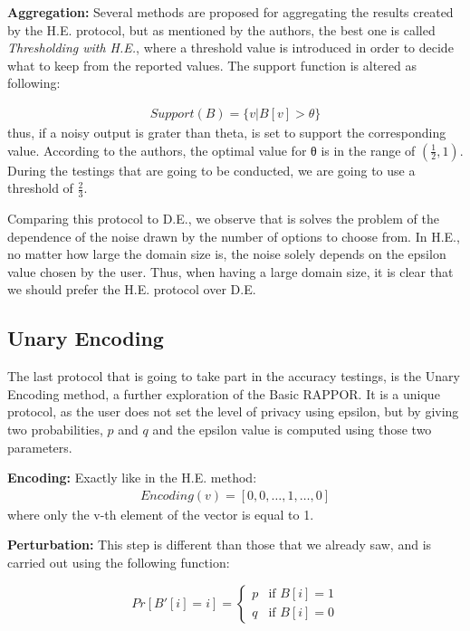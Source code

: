 \textbf{Aggregation:} Several methods are proposed for aggregating the results created by the H.E. protocol, but as mentioned by the authors, the best one is called \emph{Thresholding with H.E.}, where a threshold value is introduced in order to decide what to keep from the reported values. The support function is altered as following:

\begin{align*}
    Support(B) = \{v | B[v] > \theta\}
\end{align*}
thus, if a noisy output is grater than theta, is set to support the corresponding value. According to the authors, the optimal value for θ is in the range of $(\frac{1}{2}, 1)$. During the testings that are going to be conducted, we are going to use a threshold of $\frac{2}{3}$.


Comparing this protocol to D.E., we observe that is solves the problem of the dependence of the noise drawn by the number of options to choose from. In H.E., no matter how large the domain size is, the noise solely depends on the epsilon value chosen by the user. Thus, when having a large domain size, it is clear that we should prefer the H.E. protocol over D.E.

\subsection{Unary Encoding}

The last protocol that is going to take part in the accuracy testings, is the Unary Encoding method, a further exploration of the Basic RAPPOR. It is a unique protocol, as the user does not set the level of privacy using epsilon, but by giving two probabilities, $p$ and $q$ and the epsilon value is computed using those two parameters.

\textbf{Encoding:} Exactly like in the H.E. method:
\begin{align*}
Encoding(v) = [0, 0, \dots, 1, \dots, 0] 
\end{align*}
where only the v-th element of the vector is equal to 1.

\textbf{Perturbation:} This step is different than those that we already saw, and is carried out using the following function:


\begin{equation*}
    Pr[B'[i] = i] =
	\begin{cases}
    	p  & \mbox{if } B[i] = 1 \\
    	q & \mbox{if } B[i] = 0 
	\end{cases}
\end{equation*}

